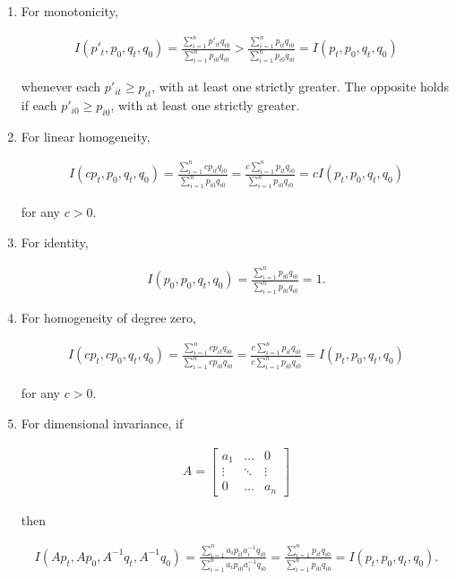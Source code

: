 \documentclass[]{article}
\begin{document}
\begin{enumerate}
\def\labelenumi{\arabic{enumi}.}
\item
  For monotonicity,

  \begin{align*}
  I(p'_{t}, p_{0}, q_{t}, q_{0}) =  \frac{\sum_{i=1}^{n} p'_{it}q_{i0}}{\sum_{i=1}^{n} p_{i0}q_{i0}} > \frac{\sum_{i=1}^{n} p_{it}q_{i0}}{\sum_{i=1}^{n} p_{i0}q_{i0}} = I(p_{t}, p_{0}, q_{t}, q_{0}) 
   \end{align*}

  whenever each \(p'_{it} \geq p_{it}\), with at least one strictly greater. The opposite holds if each \(p'_{i0} \geq p_{i0}\), with at least one strictly greater.
\item
  For linear homogeneity,

  \begin{align*}
  I(cp_{t}, p_{0}, q_{t}, q_{0}) =  \frac{\sum_{i=1}^{n} cp_{it}q_{i0}}{\sum_{i=1}^{n} p_{i0}q_{i0}} = \frac{c\sum_{i=1}^{n} p_{it}q_{i0}}{\sum_{i=1}^{n} p_{i0}q_{i0}} = cI(p_{t}, p_{0}, q_{t}, q_{0}) 
   \end{align*}

  for any \(c > 0\).
\item
  For identity,

  \begin{align*}
  I(p_{0}, p_{0}, q_{t}, q_{0}) =  \frac{\sum_{i=1}^{n} p_{i0}q_{i0}}{\sum_{i=1}^{n} p_{i0}q_{i0}} = 1.
   \end{align*}
\item
  For homogeneity of degree zero,

  \begin{align*}
  I(cp_{t}, cp_{0}, q_{t}, q_{0}) =  \frac{\sum_{i=1}^{n} cp_{it}q_{i0}}{\sum_{i=1}^{n} cp_{i0}q_{i0}} = \frac{c\sum_{i=1}^{n} p_{it}q_{i0}}{c\sum_{i=1}^{n} p_{i0}q_{i0}} = I(p_{t}, p_{0}, q_{t}, q_{0}) 
   \end{align*}

  for any \(c > 0\).
\item
  For dimensional invariance, if

  \begin{align*}
  A = 
  \begin{bmatrix}
  a_1 & \ldots & 0 \\
  \vdots & \ddots & \vdots \\
  0 & \ldots & a_n
  \end{bmatrix}
   \end{align*}

  then

  \begin{align*}
  I(Ap_{t}, Ap_{0}, A^{-1}q_{t}, A^{-1}q_{0}) = \frac{\sum_{i=1}^{n} a_{i}p_{it}a_{i}^{-1}q_{i0}}{\sum_{i=1}^{n} a_{i}p_{i0}a_{i}^{-1}q_{i0}} = \frac{\sum_{i=1}^{n} p_{it}q_{i0}}{\sum_{i=1}^{n} p_{i0}q_{i0}} = I(p_{t}, p_{0}, q_{t}, q_{0}). 
   \end{align*}
\end{enumerate}
\end{document}
